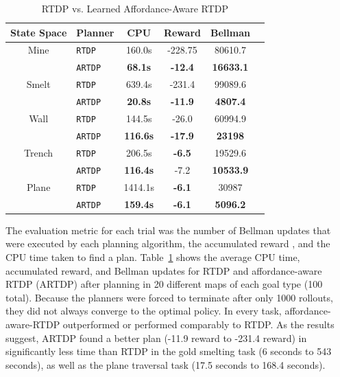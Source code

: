 \documentclass[conference]{IEEEtran}
\newcommand{\dnote}[1]{\textcolor{Green}{\textbf{}}}
\newcommand{\enote}[1]{\textcolor{Red}{\textbf{}}}
\begin{document}
\begin{table}[H]
\centering
\caption{RTDP vs. Learned Affordance-Aware RTDP}
\begin{tabular}{ c l  | c c c c}
  State Space	&	Planner 		&	CPU	&	Reward 	& Bellman \\ \hline
  Mine 	& 	\texttt{RTDP}  		& 	160.0s	&	-228.75	&	80610.7		\\
  		& 	\texttt{ARTDP}  	& 	{\bf 68.1s}	&	{\bf -12.4}	&	{\bf 16633.1}	\\  \hline
  Smelt	&	\texttt{RTDP}  		& 	639.4s	&	-231.4	&	99089.6		\\
  		&	\texttt{ARTDP}  	& 	{\bf 20.8s}	&	{\bf -11.9}	&	{\bf 4807.4}	\\  \hline
  Wall	&	\texttt{RTDP}  		& 	144.5s	&	-26.0		&	60994.9		\\
  		&	\texttt{ARTDP}  	& 	{\bf 116.6s}&	{\bf -17.9}	&	{\bf 23198}	\\  \hline
  Trench	&	\texttt{RTDP}  		& 	206.5s	&	{\bf -6.5}	&	19529.6		\\
  		&	\texttt{ARTDP}  	& 	{\bf 116.4s}&	-7.2		&	{\bf 10533.9}	\\ \hline
Plane	&	\texttt{RTDP}  		& 	1414.1s	&	{\bf -6.1}	&	30987		\\
  		&	\texttt{ARTDP}  	& 	{\bf 159.4s}&	{\bf -6.1}	&	{\bf 5096.2}	\\ 
\end{tabular}
\label{table:minecraft_results}
\end{table}

The evaluation metric for each trial was the number of Bellman updates
that were executed by each planning algorithm, the accumulated reward \enote{of the average plan right?},
and the CPU time taken to find a plan.
Table~\ref{table:minecraft_results} shows the average CPU time, accumulated reward, and Bellman updates 
for RTDP and affordance-aware RTDP (ARTDP) after planning in 20 different maps of each goal type (100 total).
Because the planners were forced to terminate after only 1000 rollouts, they did not always converge to the optimal policy.
In every task, affordance-aware-RTDP outperformed or performed comparably to RTDP. As the results suggest,
ARTDP found a better plan (-11.9 reward to -231.4 reward) in significantly less time than RTDP in the gold smelting
task (6 seconds to 543 seconds), as well as the plane traversal task (17.5 seconds to 168.4 seconds).

\dnote{Put in a note about the threshold issues, maybe include the results below to reinforce threshold business}
\end{document}

